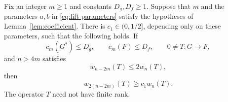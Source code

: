 \begin{lemma}\label{lem:growth}
Fix an integer \(m\ge1\) and constants \(D_g,D_f\ge1\).
Suppose that \(m\) and the parameters \(a,b\)
in \eqref{eq:lift-parameters} satisfy the hypotheses of
Lemma~\ref{lem:coefficient}. There is \(c_1\in(0,1/2]\), depending only
on these parameters, such that the following holds.
If
\[
c_m(G^*)\le D_g,\qquad c_m(F)\le D_f,\qquad 0\ne T:G\to F,
\]
and \(n>4m\) satisfies
\begin{equation}\label{eq:slow-decrease}
w_{n-2m}(T)\le2w_n(T),
\end{equation}
then
\begin{equation}\label{eq:growth}
w_{2(n-2m)}(T)\ge c_1w_n(T).
\end{equation}
The operator \(T\) need not have finite rank.
\end{lemma}

